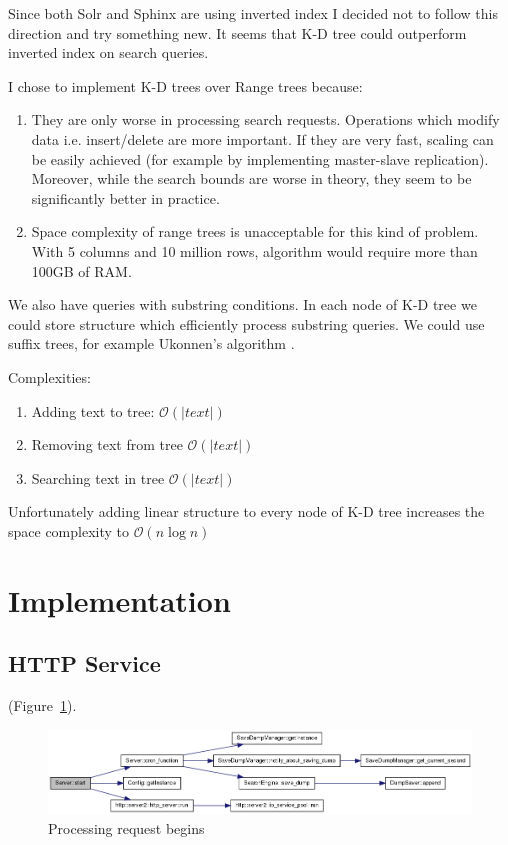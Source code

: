 \documentclass[10pt,a4paper]{article}
\newcommand{\Oh}{\mathcal{O}}
\begin{document}
\bigskip

Since both Solr and Sphinx are using inverted index I decided not to follow this direction and try something new. It seems that K-D tree could outperform inverted index on search queries.

I chose to implement K-D trees over Range trees because:
\begin{enumerate}
\item They are only worse in processing search requests. Operations which modify data i.e. insert/delete are more important. If they are very fast, scaling can be easily achieved (for example by implementing master-slave replication). Moreover, while the search bounds are worse in theory, they seem to be significantly better in practice.
\item Space complexity of range trees is unacceptable for this kind of problem. With 5 columns and 10 million rows, algorithm would require more than 100GB of RAM.
\end{enumerate}

\bigskip
We also have queries with substring conditions. In each node of K-D tree we could store structure which efficiently process substring queries. We could use suffix trees, for example Ukonnen's algorithm \cite{STUKK} .

Complexities:
\begin{enumerate}
\item Adding text to tree: $\Oh(|text|)$
\item Removing text from tree $\Oh(|text|)$
\item Searching text in tree $\Oh(|text|)$
\end{enumerate}

Unfortunately adding linear structure to every node of K-D tree increases the space complexity to $\Oh(n \log n)$

\section{Implementation}

\subsection{HTTP Service}


 (Figure~\ref{fig:httpservice}).

\begin{figure}
\centering
  \includegraphics[width=16cm]{start}
  \caption{Processing request begins}
  \label{fig:httpservice}
\end{figure}
\end{document}
